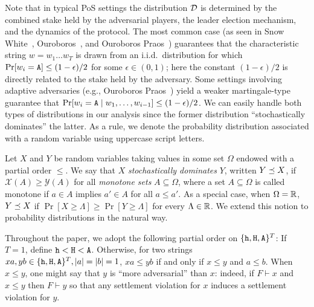  Note that in typical PoS settings the distribution $\mathcal{D}$
  is determined by the combined stake held by the adversarial players,
  the leader election mechanism, and the dynamics of the protocol. The
  most common case (as seen in Snow White~\cite{SnowWhite},
  Ouroboros~\cite{Ouroboros}, and Ouroboros Praos~\cite{Praos})
  guarantees that the characteristic string $w = w_1 \ldots w_T$ is
  drawn from an i.i.d.\ distribution for which
  $\Pr[w_i = \mathtt{A}] \leq (1 - \epsilon)/2$ for some $\epsilon \in (0, 1)$;
  here the constant $(1-\epsilon)/2$ is directly related to the stake
  held by the adversary. Some settings involving adaptive adversaries
  (e.g., Ouroboros Praos~\cite{Praos}) yield a weaker martingale-type
  guarantee that
  $\Pr[w_i = \mathtt{A} \mid w_1, \ldots, w_{i-1}] \leq (1 - \epsilon)/2$.  We
  can easily handle both types of distributions in our analysis since
  the former distribution ``stochastically dominates'' the latter.
  As a rule, we denote the
  probability distribution associated with a random variable using
  uppercase script letters. 
  \begin{definition}\label{def:dominance-mh} 
    Let $X$ and $Y$ be random variables taking values in some set $\Omega$ 
    endowed with a partial order $\leq$. 
    We say that $X$ \emph{stochastically dominates} $Y$, 
    written $Y \preceq X$, if 
    $
      \mathcal{X}(A) \geq \mathcal{Y}(A)
    $ 
    for all \emph{monotone sets} $A \subseteq \Omega$, 
    where a set $A \subseteq \Omega$ is called 
    monotone if $a \in A$ implies $a' \in A$ for all $a \leq a'$.
    As a special case, when $\Omega = \mathbb{R}$,  $Y \preceq X$ if
    $\Pr[X \geq \Lambda] \geq \Pr[Y \geq \Lambda]$
    for every $\Lambda \in \mathbb{R}$.  
    We extend this notion to probability
    distributions in the natural way.
  \end{definition}

  Throughout the paper, we adopt the following partial order on
  $\{\mathtt{h}, \mathtt{H}, \mathtt{A}\}^T$: If $T = 1$, define $\mathtt{h} < \mathtt{H} < \mathtt{A}$.  Otherwise,
  for two strings $xa, yb \in \{\mathtt{h}, \mathtt{H}, \mathtt{A}\}^T, |a| = |b| = 1$,
  $xa \leq yb$ if and only if $x \leq y$ and $a \leq b$. When
  $x \leq y$, one might say that $y$ is ``more adversarial'' than $x$:
  indeed, if $F \vdash x$ and $x \leq y$ then $F \vdash y$ so that any
  settlement violation for $x$ induces a settlement violation for $y$.


